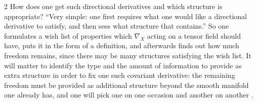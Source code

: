 \begin{paracol}{2}
How does one get such directional derivatives and which structure is appropriate? ``Very simple: one first requires what one would like a directional derivative to satisfy, and then sees what structure that contains.'' So one formulates a wish list of properties which $\nabla_X$ acting on a tensor field should have, puts it in the form of a definition, and afterwards finds out how much freedom remains, since there may be many structures satisfying the wish list.
It will matter to identify the type and the amount of information to provide as extra structure in order to fix one such covariant derivative: the remaining freedom must be provided as additional structure beyond the smooth manifold one already has, and one will pick one on one occasion and another on another
.


\end{paracol}
